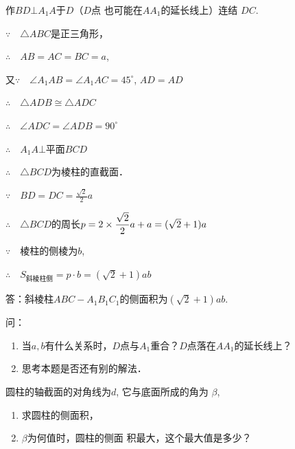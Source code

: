 \begin{solution}
作$BD\bot A_1A$于$D$（$D$点
也可能在$AA_1$的延长线上）连结
$DC$.

$\because\quad \triangle ABC$是正三角形，

$\therefore\quad AB=AC=BC=a$,

又$\because\quad \angle A_1AB=\angle A_1AC=45^{\circ}$, $AD=AD$

$\therefore\quad \triangle ADB\cong \triangle ADC$

$\therefore\quad \angle ADC=\angle ADB=90^{\circ}$

$\therefore\quad A_1A\bot$平面$BCD$

$\therefore\quad \triangle BCD$为棱柱的直截面．

$\because\quad BD=DC=\frac{\sqrt{2}}{2}a$

$\therefore\quad \triangle BCD$的周长$p=2\times\dfrac{\sqrt{2}}{2}a+a=(\sqrt{2}+1)a$

$\because\quad $棱柱的侧棱为$b$,

$\therefore\quad S_{\text{斜棱柱侧}}=p\cdot b=(\sqrt{2}+1)ab$

答：斜棱柱$ABC-A_1B_1C_1$的侧面积为$(\sqrt{2}+1)ab$.

问：
\begin{enumerate}
    \item 当$a,b$有什么关系时，$D$点与$A_1$重合？$D$点落在$AA_1$的延长线上？
    \item 思考本题是否还有别的解法．
\end{enumerate}
\end{solution}



\begin{example}
    圆柱的轴截面的对角线为$d$, 它与底面所成的角为
$\beta$,
\begin{enumerate}
    \item 求圆柱的侧面积，
    \item $\beta$为何值时，圆柱的侧面
积最大，这个最大值是多少？
\end{enumerate}
\end{example}

\begin{figure}[htp]
    \centering
{}
    \caption{}
\end{figure}


